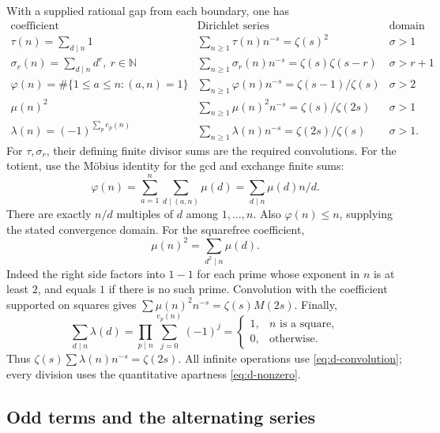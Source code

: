 With a supplied rational gap from each boundary, one has
\[
\begin{array}{c|c|c}
\text{coefficient}&\text{Dirichlet series}&\text{domain}\\ \hline
\tau(n)=\sum_{d\mid n}1
 &\displaystyle\sum_{n\geq1}\tau(n)n^{-s}=\zeta(s)^2&\sigma>1\\[3pt]
\sigma_r(n)=\sum_{d\mid n}d^r,\ r\in\mathbb N
 &\displaystyle\sum_{n\geq1}\sigma_r(n)n^{-s}=\zeta(s)\zeta(s-r)&\sigma>r+1\\[3pt]
\varphi(n)=\#\{1\leq a\leq n:(a,n)=1\}
 &\displaystyle\sum_{n\geq1}\varphi(n)n^{-s}=\zeta(s-1)/\zeta(s)&\sigma>2\\[3pt]
\mu(n)^2
 &\displaystyle\sum_{n\geq1}\mu(n)^2n^{-s}=\zeta(s)/\zeta(2s)&\sigma>1\\[3pt]
\lambda(n)=(-1)^{\sum_p e_p(n)}
 &\displaystyle\sum_{n\geq1}\lambda(n)n^{-s}=\zeta(2s)/\zeta(s)&\sigma>1 .
\end{array}                                                   \tag{D15}\label{eq:d-arithmetic-series}
\]
For \(\tau,\sigma_r\), their defining finite divisor sums are the
required convolutions. For the totient, use the M\"obius identity for
the gcd and exchange finite sums:
\[
 \varphi(n)=\sum_{a=1}^n\sum_{d\mid(a,n)}\mu(d)
           =\sum_{d\mid n}\mu(d)n/d.
\]
There are exactly \(n/d\) multiples of \(d\) among \(1,\ldots,n\).
Also \(\varphi(n)\leq n\), supplying the stated convergence domain.
For the squarefree coefficient,
\[
                         \mu(n)^2=\sum_{d^2\mid n}\mu(d).
\]
Indeed the right side factors into \(1-1\) for each prime whose exponent
in \(n\) is at least \(2\), and equals \(1\) if there is no such prime.
Convolution with the coefficient supported on squares gives
\(\sum\mu(n)^2n^{-s}=\zeta(s)M(2s)\).
Finally,
\[
 \sum_{d\mid n}\lambda(d)
     =\prod_{p\mid n}\sum_{j=0}^{e_p(n)}(-1)^j
     =
     \begin{cases}1,&n\text{ is a square},\\0,&\text{otherwise}.\end{cases}
\]
Thus \(\zeta(s)\sum\lambda(n)n^{-s}=\zeta(2s)\).
All infinite operations use \eqref{eq:d-convolution}; every division
uses the quantitative apartness \eqref{eq:d-nonzero}.

\subsection{Odd terms and the alternating series}

